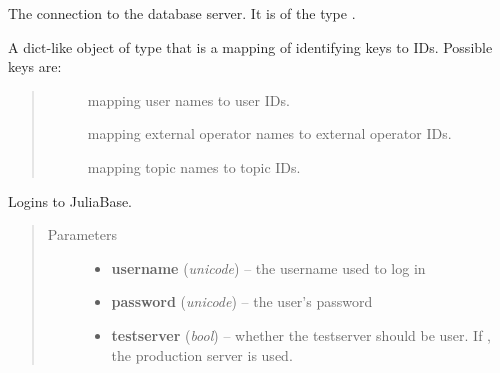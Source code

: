 \documentclass[a4paper,11pt,english]{sphinxmanual}
\begin{document}
\begin{fulllineitems}
\label{programming/remote_client:jb_remote.common.connection}
The connection to the database server.  It is of the type
{\hyperref[programming/remote_client:jb_remote.common.JuliaBaseConnection]{}}.

\end{fulllineitems}


\begin{fulllineitems}
\label{programming/remote_client:jb_remote.common.primary_keys}
A dict-like object of type {\hyperref[programming/remote_client:jb_remote.common.PrimaryKeys]{}} that is a mapping of
identifying keys to IDs.  Possible keys are:
\begin{quote}
\begin{description}
\item[{}] \leavevmode
mapping user names to user IDs.

\item[{}] \leavevmode
mapping external operator names to external operator IDs.

\item[{}] \leavevmode
mapping topic names to topic IDs.

\end{description}
\end{quote}

\end{fulllineitems}


\begin{fulllineitems}
\label{programming/remote_client:jb_remote.common.login}
Logins to JuliaBase.
\begin{quote}\begin{description}
\item[{Parameters}] \leavevmode\begin{itemize}
\item {} 
\textbf{username} (\emph{unicode}) -- the username used to log in

\item {} 
\textbf{password} (\emph{unicode}) -- the user's password

\item {} 
\textbf{testserver} (\emph{bool}) -- whether the testserver should be user.  If , the
production server is used.

\end{itemize}

\end{description}\end{quote}

\end{fulllineitems}
\end{document}
